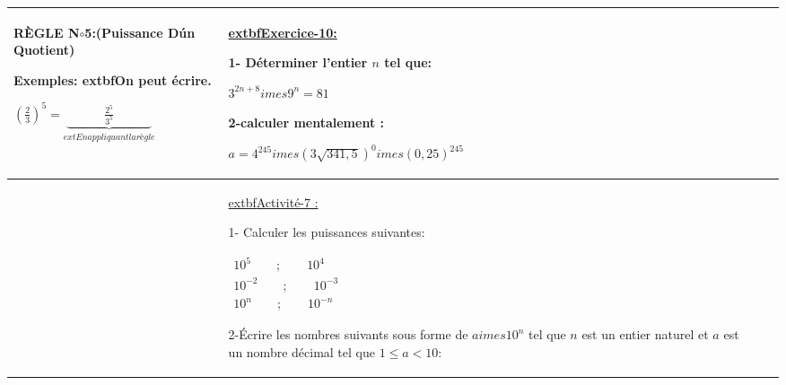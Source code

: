 \documentclass[11pt,a4paper,landscape]{article}
\begin{document}
\begin{longtable}{|>{\centering\arraybackslash}p{3cm}|>{\raggedright\arraybackslash}p{5cm}|>{\raggedright\arraybackslash}p{13.5cm}|>{\raggedright\arraybackslash}p{5cm}|}
\begin{BoxRafa}[colbacktitle = green]{RÈGLE N$\circ$5:(Puissance D\'un Quotient)}
\begin{tikzpicture}[
roundnode/.style={circle, draw=green!60, fill=green!5, very thick, minimum size=7mm},
squarednode/.style={rectangle, draw=red!60, fill=red!5, very thick, minimum size=5mm},
]
\end{tikzpicture}\vspace{-.1cm}
\end{BoxRafa}
\begin{BoxRafa}[colbacktitle = Orange]{Exemples:}
extbf{On peut écrire.}

$\left(\frac23\right)^5=\underbrace{\quad\qquad\frac{2^5}{3^5}\quad\qquad}_{ext{En appliquant la règle}}$

\end{BoxRafa}
&
\colorbox{yellow!50!white}{\uline{\sffamily extbf{Exercice-10:}}}\par
1- Déterminer l’entier $n$ tel que:

$3^{2n+8}imes9^n=81$

2-calculer mentalement :

$a{=}4^{245}{imes}(3\sqrt{341,5})^0{imes}(0,25)^{245}$
\\
\hline
&
\colorbox{yellow!50!white}{\uline{\sffamily extbf{Activité-7 :} }}\par%

1- Calculer les puissances suivantes:

$\begin{array}{c}10^5\qquad;\qquad10^4\\10^{-2}\qquad;\qquad10^{-3}\\10^n\qquad;\qquad10^{-n}\end{array}$

2-Écrire les nombres suivants sous forme de $aimes10^n$ tel que $n$ est un entier naturel et $a$ est un nombre décimal tel que $1\leq a<10$: 


\end{longtable}
\end{document}
